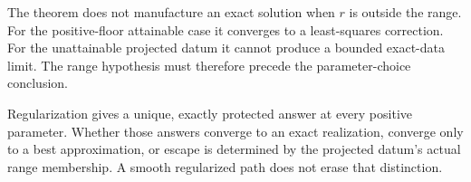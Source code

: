 The theorem does not manufacture an exact solution when $r$ is outside the range. For the positive-floor attainable case it converges to a least-squares correction. For the unattainable projected datum it cannot produce a bounded exact-data limit. The range hypothesis must therefore precede the parameter-choice conclusion.


\begin{insight}
Regularization gives a unique, exactly protected answer at every positive parameter. Whether those answers converge to an exact realization, converge only to a best approximation, or escape is determined by the projected datum's actual range membership. A smooth regularized path does not erase that distinction.
\end{insight}
